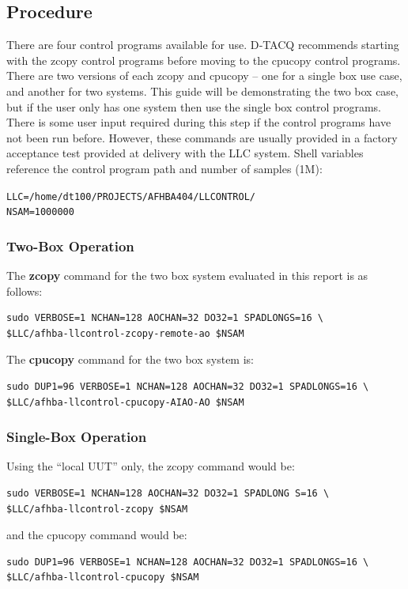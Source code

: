 \documentclass{article}
\begin{document}
\subsection{Procedure}
There are four control programs available for use.
D‑TACQ  recommends starting with the zcopy control programs before moving to the cpucopy control programs.
There are two versions of each zcopy and cpucopy – one for a single box use case, and another for two systems.
This guide will be demonstrating the two box case, but if the user only has one system then use the single box control programs.
There is some user input required during this step if the control programs have not been run before.
However, these commands are usually provided in a factory acceptance test provided at delivery with the LLC system.
Shell variables reference the control program path and number of samples (1M):

\texttt{LLC=/home/dt100/PROJECTS/AFHBA404/LLCONTROL/ \\
NSAM=1000000}

\subsubsection{Two-Box Operation}
The \textbf{zcopy} command for the two box system evaluated in this report is as follows:

\begin{verbatim}
sudo VERBOSE=1 NCHAN=128 AOCHAN=32 DO32=1 SPADLONGS=16 \
$LLC/afhba-llcontrol-zcopy-remote-ao $NSAM
\end{verbatim}

The \textbf{cpucopy} command for the two box system is:
\begin{verbatim}
sudo DUP1=96 VERBOSE=1 NCHAN=128 AOCHAN=32 DO32=1 SPADLONGS=16 \
$LLC/afhba-llcontrol-cpucopy-AIAO-AO $NSAM
\end{verbatim}

\subsubsection{Single-Box Operation}

Using the “local UUT” only, the zcopy command would be:
\begin{verbatim}
sudo VERBOSE=1 NCHAN=128 AOCHAN=32 DO32=1 SPADLONG S=16 \
$LLC/afhba-llcontrol-zcopy $NSAM
\end{verbatim}

and the cpucopy command would be:

\begin{verbatim}
sudo DUP1=96 VERBOSE=1 NCHAN=128 AOCHAN=32 DO32=1 SPADLONGS=16 \
$LLC/afhba-llcontrol-cpucopy $NSAM
\end{verbatim}
\end{document}
